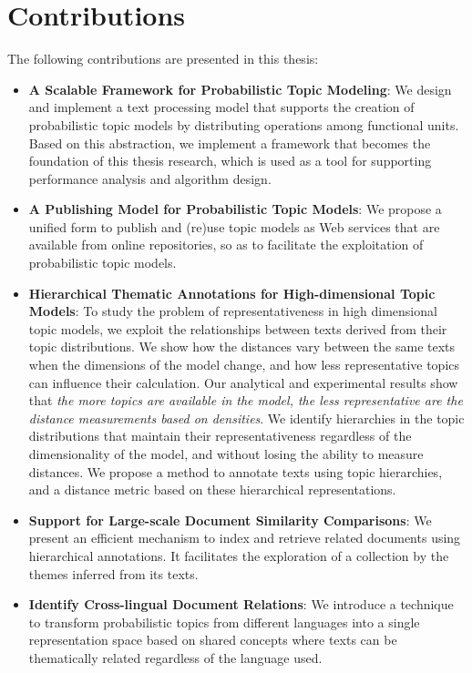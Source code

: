 \section{Contributions}

The following contributions are presented in this thesis:

\begin{itemize}
\item \textbf{A Scalable Framework for Probabilistic Topic Modeling}: We design and implement a text processing model that supports the creation of probabilistic topic models by distributing operations among functional units. Based on this abstraction, we implement a framework that becomes the foundation of this thesis research, which is used as a tool for supporting performance analysis and algorithm design.
\item \textbf{A Publishing Model for Probabilistic Topic Models}: We propose a unified form to publish and (re)use topic models as Web services that are available from online repositories, so as to facilitate the exploitation of probabilistic topic models.
\item \textbf{Hierarchical Thematic Annotations for High-dimensional Topic Models}: To study the problem of representativeness in high dimensional topic models, we exploit the relationships between texts derived from their topic distributions. We show how the distances vary between the same texts when the dimensions of the model change, and how less representative topics can influence their calculation. Our analytical and experimental results show that \textit{the more topics are available in the model, the less representative are the distance measurements based on densities}. We identify hierarchies in the topic distributions that maintain their representativeness regardless of the dimensionality of the model, and without losing the ability to measure distances. We propose a method to annotate texts using topic hierarchies, and a distance metric based on these hierarchical representations.
\item \textbf{Support for Large-scale Document Similarity Comparisons}: We present an efficient mechanism to index and retrieve related documents using hierarchical annotations. It facilitates the exploration of a collection by the themes inferred from its texts.
\item \textbf{Identify Cross-lingual Document Relations}: We introduce a technique to transform probabilistic topics from different languages into a single representation space based on shared concepts where texts can be thematically related regardless of the language used.
\end{itemize}

